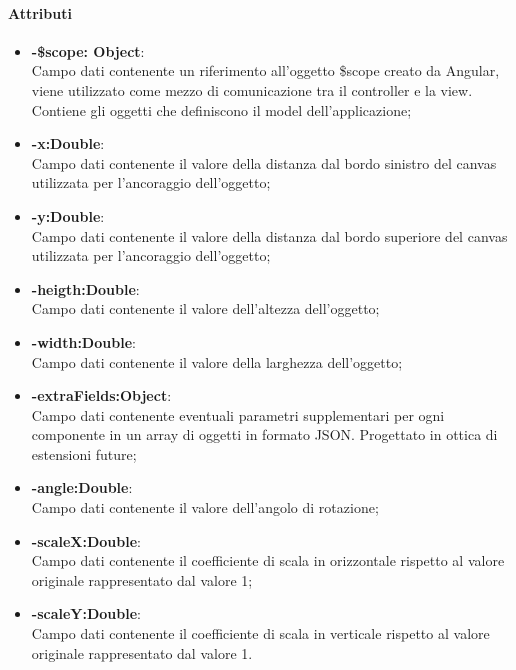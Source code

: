 	\paragraph{Attributi}
	\begin{itemize}
		\item \textbf{-\$scope: Object}:\\
			Campo dati contenente un riferimento all'oggetto \$scope creato da Angular, viene utilizzato come mezzo di comunicazione tra il controller e la view. Contiene gli oggetti che definiscono il model dell'applicazione;
		\item\textbf{-x:Double}:\\
			Campo dati contenente il valore della distanza dal bordo sinistro del canvas utilizzata per l'ancoraggio dell'oggetto;
		\item\textbf{-y:Double}:\\
			Campo dati contenente il valore della distanza dal bordo superiore del canvas utilizzata per l'ancoraggio dell'oggetto;
		\item\textbf{-heigth:Double}:\\
			Campo dati contenente il valore dell'altezza dell'oggetto;
		\item\textbf{-width:Double}:\\
			Campo dati contenente il valore della larghezza dell'oggetto;
		\item\textbf{-extraFields:Object}:\\
			Campo dati contenente eventuali parametri supplementari per ogni componente in un array di oggetti in formato JSON. Progettato in ottica di estensioni future;
		\item\textbf{-angle:Double}:\\
			Campo dati contenente il valore dell'angolo di rotazione;
		\item\textbf{-scaleX:Double}:\\
			Campo dati contenente il coefficiente di scala in orizzontale rispetto al valore originale rappresentato dal valore 1;
		\item\textbf{-scaleY:Double}:\\
			Campo dati contenente il coefficiente di scala in verticale rispetto al valore originale rappresentato dal valore 1.

	\end{itemize}

